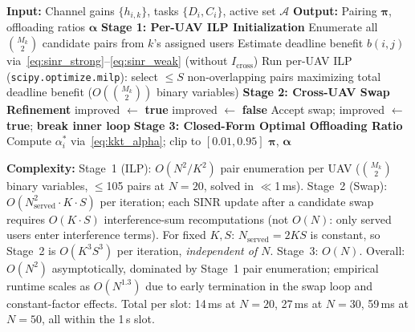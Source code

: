\documentclass[journal]{IEEEtran}
\begin{document}
\begin{algorithm}[t]
\caption{Interference-Aware User Pairing and Task Offloading.}
\label{alg:main}
\begin{algorithmic}[1]
\STATE \textbf{Input:} Channel gains $\{h_{i,k}\}$, tasks $\{D_i, C_i\}$, active set $\mathcal{A}$
\STATE \textbf{Output:} Pairing $\boldsymbol{\pi}$, offloading ratios $\boldsymbol{\alpha}$
\STATE \textbf{Stage 1: Per-UAV ILP Initialization}
    \STATE Enumerate all $\binom{M_k}{2}$ candidate pairs from $k$'s assigned users
    \STATE Estimate deadline benefit $b(i,j)$ via~\eqref{eq:sinr_strong}--\eqref{eq:sinr_weak} (without $I_{\text{cross}}$)
    \STATE Run per-UAV ILP (\texttt{scipy.optimize.milp}): select $\leq S$ non-overlapping pairs maximizing total deadline benefit ($O(\binom{M_k}{2})$ binary variables)
\ENDFOR
\STATE \textbf{Stage 2: Cross-UAV Swap Refinement}
\STATE improved $\leftarrow$ \textbf{true}
    \STATE improved $\leftarrow$ \textbf{false}
            \STATE Accept swap; improved $\leftarrow$ \textbf{true}; \textbf{break inner loop}
        \ENDIF
    \ENDFOR
\ENDWHILE {}
\STATE \textbf{Stage 3: Closed-Form Optimal Offloading Ratio}
    \STATE Compute $\alpha_i^*$ via~\eqref{eq:kkt_alpha}; clip to $[0.01, 0.95]$
\ENDFOR
\RETURN $\boldsymbol{\pi}$, $\boldsymbol{\alpha}$
\end{algorithmic}
\end{algorithm}

\textbf{Complexity:} Stage~1 (ILP): $O(N^2/K^2)$ pair enumeration per UAV ($\binom{M_k}{2}$ binary variables, $\leq$105 pairs at $N\!=\!20$, solved in $\ll$1\,ms).
Stage~2 (Swap): $O(N_{\text{served}}^2 \cdot K \cdot S)$ per iteration; each SINR update after a candidate swap requires $O(K\!\cdot\!S)$ interference-sum recomputations (not $O(N)$: only served users enter interference terms). For fixed $K,S$: $N_{\text{served}} = 2KS$ is constant, so Stage~2 is $O(K^3 S^3)$ per iteration, \emph{independent of $N$}.
Stage~3: $O(N)$.
Overall: $O(N^2)$ asymptotically, dominated by Stage~1 pair enumeration; empirical runtime scales as $O(N^{1.3})$ due to early termination in the swap loop and constant-factor effects.
Total per slot: 14\,ms at $N\!=\!20$, 27\,ms at $N\!=\!30$, 59\,ms at $N\!=\!50$, all within the 1\,s slot.

\end{document}
